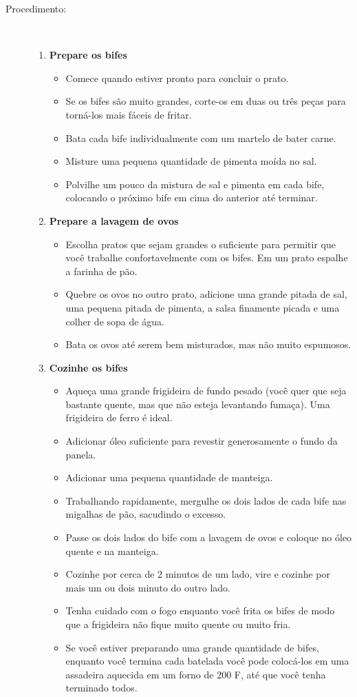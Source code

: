 \documentclass [11pt, letterpaper] {article}
\begin{document}
\begin {description}
\item [Procedimento:] \ \\
\begin {enumerate}
\item {\bf Prepare os bifes}
\begin {itemize}
\item Comece quando estiver pronto para concluir o prato.
\item Se os bifes são muito grandes, corte-os em duas ou três peças para torná-los mais fáceis de fritar.
\item Bata cada bife individualmente com um martelo de bater carne.
\item Misture uma pequena quantidade de pimenta moída no sal.
\item Polvilhe um pouco da mistura de sal e pimenta em cada bife, colocando o próximo bife em cima do anterior até terminar.
\end {itemize}
\item {\bf Prepare a lavagem de ovos}
\begin {itemize}
\item Escolha pratos que sejam grandes o suficiente para permitir que você trabalhe confortavelmente com os bifes. Em um prato espalhe a farinha de p\~ao.
\item Quebre os ovos no outro prato, adicione uma grande pitada de sal, uma pequena pitada de pimenta, a salsa finamente picada e uma colher de sopa de água.
\item Bata os ovos até serem bem misturados, mas não muito espumosos.
\end {itemize}
\item {\bf Cozinhe os bifes}
\begin {itemize}
\item Aqueça uma grande frigideira de fundo pesado (você quer que seja bastante quente, mas que não esteja levantando fuma\c{c}a). Uma frigideira de ferro \'e ideal.
\item Adicionar óleo suficiente para revestir generosamente o fundo da panela.
\item Adicionar uma pequena quantidade de manteiga.
\item Trabalhando rapidamente, mergulhe os dois lados de cada bife nas migalhas de pão, sacudindo o excesso.
\item Passe os dois lados do bife com a lavagem de ovos e coloque no óleo quente e na manteiga.
\item Cozinhe por cerca de 2 minutos de um lado, vire e cozinhe por mais um ou dois minuto do outro lado.
\item Tenha cuidado com o fogo enquanto você frita os bifes de modo que a frigideira não fique muito quente ou muito fria.
\item Se você estiver preparando uma grande quantidade de bifes, enquanto você termina cada batelada você pode colocá-los em uma assadeira aquecida em um forno de 200 F, até que você tenha terminado todos.
\end {itemize}
\end {enumerate}
\end {description}
\end{document}

